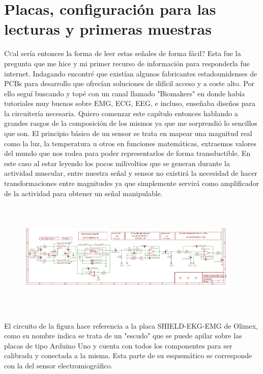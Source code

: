 \chapter{Placas, configuración para las lecturas y primeras muestras}
\label{chap:cap1}

\lettrine Cual sería entonces la forma de leer estas señales de forma fácil? Esta fue la pregunta que me hice y mi primer recurso de información para responderla fue internet. Indagando encontré que existían algunos fabricantes estadounidenses de PCBs para desarrollo que ofrecían soluciones de difícil acceso y a coste alto. Por ello seguí buscando y topé con un canal llamado "Biomakers" en donde había tutoriales muy buenos sobre EMG, ECG, EEG, e incluso, enseñaba diseños para la circuitería necesaria. Quiero comenzar este capítulo entonces hablando a grandes rasgos de la composición de los mismos ya que me sorprendió lo sencillos que son. El principio básico de un sensor se trata en mapear una magnitud real como la luz, la temperatura u otros en funciones matemáticas, extraemos valores del mundo que nos rodea para poder representarlos de forma transductible. En este caso al estar leyendo los pocos milivoltios que se generan durante la actividad muscular, entre nuestra señal y sensor no existirá la necesidad de hacer transformaciones entre magnitudes ya que simplemente servirá como amplificador de la actividad para obtener un señal manipulable.

\begin{figure}[hp!]
\begin{center}
    \includegraphics[width=0.95\textwidth,scale=0.5, height=5.5cm]{imaxes/circuito.png}

  \end{center}
\end{figure}

El circuito de la figura hace referencia a la placa SHIELD-EKG-EMG de Olimex, como su nombre indica se trata de un "escudo" que se puede apilar sobre las placas de tipo Arduino Uno y cuenta con todos los componentes para ser calibrada y conectada a la misma. Esta parte de su esquemático se corresponde con la del sensor electromiográfico. 

